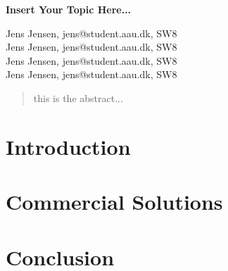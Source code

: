 \documentclass[12pt,a4paper]{article}
\begin{document}
\begin{center}
\bigskip\bigskip
{\Large\bf Insert Your Topic Here...}
\bigskip\bigskip


Jens Jensen, jens@student.aau.dk, SW8\\
Jens Jensen, jens@student.aau.dk, SW8\\
Jens Jensen, jens@student.aau.dk, SW8\\
Jens Jensen, jens@student.aau.dk, SW8

\bigskip
\begin{abstract}
this is the abstract...
\end{abstract}

\thispagestyle{empty}
\end{center}


\titlepage



\thispagestyle{plain}


\section{Introduction}

\section{Commercial Solutions}


\section{Conclusion}




\end{document}
